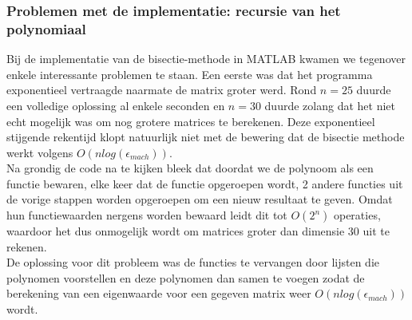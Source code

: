 \documentclass[a4paper]{article}
\begin{document}
\subsubsection{Problemen met de implementatie: recursie van het polynomiaal}
Bij de implementatie van de bisectie-methode in MATLAB kwamen we tegenover enkele interessante problemen te staan. Een eerste was dat het programma exponentieel vertraagde naarmate de matrix groter werd. Rond $n=25$ duurde een volledige oplossing al enkele seconden en $n=30$ duurde zolang dat het niet echt mogelijk was om nog grotere matrices te berekenen. Deze exponentieel stijgende rekentijd klopt natuurlijk niet met de bewering dat de bisectie methode werkt volgens $O(nlog(\epsilon_{mach}))$. \\
Na grondig de code na te kijken bleek dat doordat we de polynoom als een functie bewaren, elke keer dat de functie opgeroepen wordt, 2 andere functies uit de vorige stappen worden opgeroepen om een nieuw resultaat te geven. Omdat hun functiewaarden nergens worden bewaard leidt dit tot $O(2^{n})$ operaties, waardoor het dus onmogelijk wordt om matrices groter dan dimensie 30 uit te rekenen. \\
De oplossing voor dit probleem was de functies te vervangen door lijsten die polynomen voorstellen en deze polynomen dan samen te voegen zodat de berekening van een eigenwaarde voor een gegeven matrix weer $O(nlog(\epsilon_{mach}))$ wordt.
\end{document}

